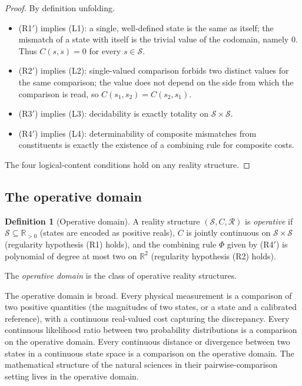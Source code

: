 \documentclass[11pt,a4paper]{article}
\theoremstyle{definition}
\newtheorem{definition}[theorem]{Definition}
\theoremstyle{remark}
\begin{document}
\begin{proof}
By definition unfolding.
\begin{itemize}[leftmargin=*]
\item (R1$'$) implies (L1): a single, well-defined state is the same
as itself; the mismatch of a state with itself is the trivial value of
the codomain, namely $0$. Thus $C(s, s) = 0$ for every
$s \in \mathcal{S}$.
\item (R2$'$) implies (L2): single-valued comparison forbids two
distinct values for the same comparison; the value does not depend on
the side from which the comparison is read, so $C(s_1, s_2) = C(s_2,
s_1)$.
\item (R3$'$) implies (L3): decidability is exactly totality on
$\mathcal{S} \times \mathcal{S}$.
\item (R4$'$) implies (L4): determinability of composite mismatches
from constituents is exactly the existence of a combining rule for
composite costs.
\end{itemize}
The four logical-content conditions hold on any reality structure.
\end{proof}

\subsection{The operative domain}

\begin{definition}[Operative domain]
\label{def:operative-domain}
A reality structure $(\mathcal{S}, C, \mathcal{R})$ is
\emph{operative} if $\mathcal{S} \subseteq \mathbb{R}_{>0}$ (states
are encoded as positive reals), $C$ is jointly continuous on
$\mathcal{S} \times \mathcal{S}$ (regularity hypothesis (R1) holds),
and the combining rule $\Phi$ given by (R4$'$) is polynomial of
degree at most two on $\mathbb{R}^2$ (regularity hypothesis (R2)
holds).

The \emph{operative domain} is the class of operative reality
structures.
\end{definition}

The operative domain is broad. Every physical measurement is a
comparison of two positive quantities (the magnitudes of two states,
or a state and a calibrated reference), with a continuous real-valued
cost capturing the discrepancy. Every continuous likelihood ratio
between two probability distributions is a comparison on the
operative domain. Every continuous distance or divergence between two
states in a continuous state space is a comparison on the operative
domain. The mathematical structure of the natural sciences in their
pairwise-comparison setting lives in the operative domain.
\end{document}
